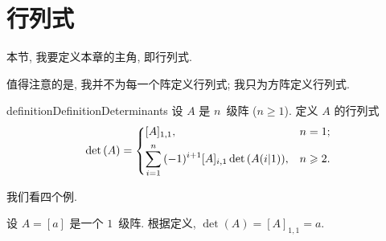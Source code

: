 \documentclass[%
    UTF8,%
    fontset=none,%
    punct=kaiming,%
    zihao=-4,%
    a4paper,%
    oneside,%
]{ctexbook}
\renewcommand*{\geq}{\geqslant}
\begin{document}
\section{行列式}

本节, 我要定义本章的主角, 即行列式.

值得注意的是, 我并不为每一个阵定义行列式;
我只为方阵定义行列式.

\begin{restatable}[行列式]{definition}{DefinitionDeterminants}
    设 \(A\) 是 \(n\)~级阵 (\(n \geq 1\)).
    定义 \(A\) 的行列式
    \begin{align*}
        \det {(A)}
        =
        \begin{dcases}
            [A]_{1,1},
             & n = 1;    \\
            \sum_{i = 1}^{n}
            {(-1)^{i+1} [A]_{i,1} \det {(A(i|1))}},
             & n \geq 2.
        \end{dcases}
    \end{align*}
\end{restatable}

我们看四个例.

\begin{example}
    设 \(A = [a]\) 是一个 \(1\)~级阵.
    根据定义, \(\det {(A)} = [A]_{1,1} = a\).
\end{example}
\end{document}
